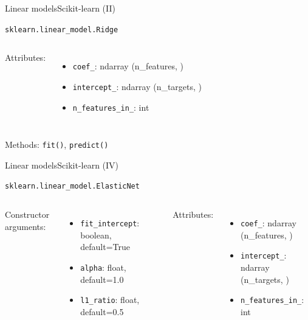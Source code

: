 \documentclass[10pt,compress]{beamer} %
\begin{document}
{\begin{frame}{Linear models}{Scikit-learn (II)}
\begin{exampleblock}{\texttt{sklearn.linear\_model.Ridge}}
\begin{columns}[T]
                Attributes:
                \begin{itemize}
                    \item \texttt{coef\_}:  ndarray (n\_features, )
                    \item \texttt{intercept\_}:  ndarray (n\_targets, )
                    \item \texttt{n\_features\_in\_}: int
                \end{itemize}
            \end{columns}

            \medskip

            Methods: \texttt{fit()}, \texttt{predict()}
        \end{exampleblock}

        \medskip

    \end{frame}

    \begin{frame}{Linear models}{Scikit-learn (IV)}
        \begin{exampleblock}{\texttt{sklearn.linear\_model.ElasticNet}}
         \medskip

         \begin{columns}[T]
                Constructor arguments:
                \begin{itemize}
                    \item \texttt{fit\_intercept}: boolean, default=True
                    \item \texttt{alpha}: float, default=1.0
                    \item \texttt{l1\_ratio}: float, default=0.5
                \end{itemize}

                Attributes:
                \begin{itemize}
                    \item \texttt{coef\_}:  ndarray (n\_features, )
                    \item \texttt{intercept\_}:  ndarray (n\_targets, )
                    \item \texttt{n\_features\_in\_}: int
                \end{itemize}
            \end{columns}

            \medskip


\end{exampleblock}
\end{frame}}
\end{document}
